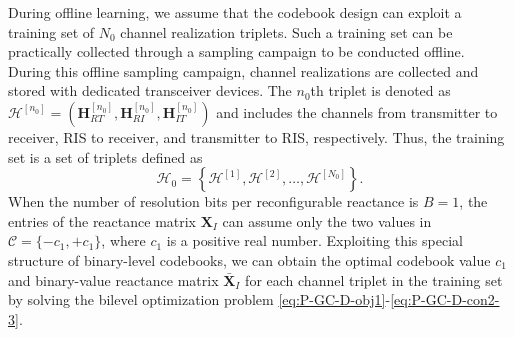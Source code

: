 \documentclass[twocolumn,10pt]{IEEEtran}
\begin{document}
During offline learning, we assume that the codebook design can exploit a training set of $N_0$ channel realization triplets.
Such a training set can be practically collected through a sampling campaign to be conducted offline.
During this offline sampling campaign, channel realizations are collected and stored with dedicated transceiver devices.
The $n_0$th triplet is denoted as $\mathcal{H}^{[n_0]}=(\mathbf{H}_{RT}^{[n_0]},\mathbf{H}_{RI}^{[n_0]},\mathbf{H}_{IT}^{[n_0]})$ and includes the channels from transmitter to receiver, RIS to receiver, and transmitter to RIS, respectively.
Thus, the training set is a set of triplets defined as
\begin{equation}
\mathcal{H}_0=\left\{\mathcal{H}^{[1]},\mathcal{H}^{[2]},\ldots,\mathcal{H}^{[N_0]}\right\}.
\end{equation}
When the number of resolution bits per reconfigurable reactance is $B=1$, the entries of the reactance matrix $\mathbf{X}_{I}$ can assume only the two values in $\mathcal{C}=\{-c_{1},+c_{1}\}$, where $c_{1}$ is a positive real number.
Exploiting this special structure of binary-level codebooks, we can obtain the optimal codebook value $c_{1}$ and binary-value reactance matrix $\bar{\mathbf{X}}_I$ for each channel triplet in the training set by solving the bilevel optimization problem \eqref{eq:P-GC-D-obj1}-\eqref{eq:P-GC-D-con2-3}.
\end{document}

